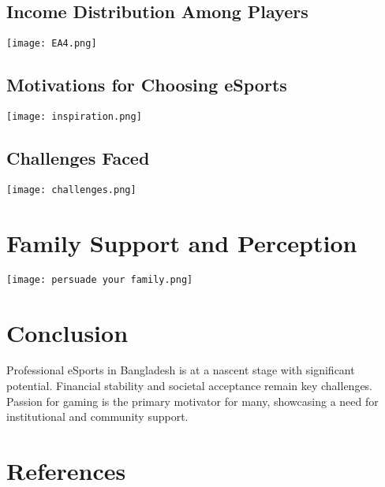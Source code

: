 \documentclass[a0paper,portrait]{a0poster}
\begin{document}
\begin{multicols}{3}
\subsection*{Income Distribution Among Players}
\texttt{[image: EA4.png]}

\subsection*{Motivations for Choosing eSports}
\texttt{[image: inspiration.png]}

\subsection*{Challenges Faced}
\texttt{[image: challenges.png]}

\section*{Family Support and Perception}
\texttt{[image: persuade your family.png]}

\section*{Conclusion}
Professional eSports in Bangladesh is at a nascent stage with significant potential. Financial stability and societal acceptance remain key challenges. Passion for gaming is the primary motivator for many, showcasing a need for institutional and community support.

\section*{References}



\end{multicols}
\end{document}
